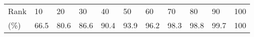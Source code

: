 %

{
\ttfamily\small
 \begin{tabular}{lllllllllll}
 \toprule\noalign{\smallskip} 
 Rank & 10 & 20 & 30 & 40 & 50 & 60 & 70 & 80 & 90 & 100\\

\noalign{\smallskip} 
\midrule
\noalign{\smallskip} 
(\%) & 66.5 & 80.6 & 86.6 & 90.4 & 93.9 & 96.2 & 98.3 & 98.8 & 99.7 & 100\\

\bottomrule 
 \end{tabular} 
 
}
